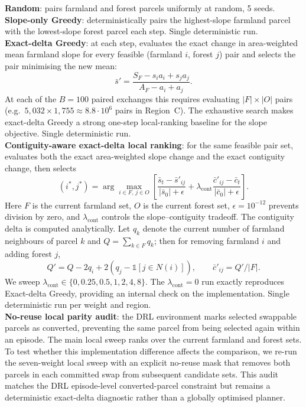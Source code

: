 \documentclass[]{interact}
\theoremstyle{plain}
\begin{document}
\textbf{Random}: pairs farmland and forest parcels uniformly at random, 5 seeds.\\
\textbf{Slope-only Greedy}: deterministically pairs the highest-slope farmland parcel with the lowest-slope forest parcel each step. Single deterministic run.\\
\textbf{Exact-delta Greedy}: at each step, evaluates the exact change in area-weighted mean farmland slope for every feasible (farmland $i$, forest $j$) pair and selects the pair minimising the new mean:
$$\bar{s}' = \frac{S_F - s_i a_i + s_j a_j}{A_F - a_i + a_j}.$$
At each of the $B = 100$ paired exchanges this requires evaluating $|F| \times |O|$ pairs (e.g.\ $5{,}032 \times 1{,}755 \approx 8.8 \cdot 10^6$ pairs in Region~C). The exhaustive search makes exact-delta Greedy a strong one-step local-ranking baseline for the slope objective. Single deterministic run.\\
\textbf{Contiguity-aware exact-delta local ranking}: for the same feasible pair set, evaluates both the exact area-weighted slope change and the exact contiguity change, then selects
\begin{equation}
(i^\ast,j^\ast) = \arg\max_{i \in F,\, j \in O}
\left[
\frac{\bar{s}_t-\bar{s}'_{ij}}{|\bar{s}_0|+\epsilon}
+ \lambda_{\mathrm{cont}}
\frac{\bar{c}'_{ij}-\bar{c}_t}{|\bar{c}_0|+\epsilon}
\right].
\label{eq:local-scalar}
\end{equation}
Here $F$ is the current farmland set, $O$ is the current forest set, $\epsilon=10^{-12}$ prevents division by zero, and $\lambda_{\mathrm{cont}}$ controls the slope--contiguity tradeoff. The contiguity delta is computed analytically. Let $q_k$ denote the current number of farmland neighbours of parcel $k$ and $Q=\sum_{k\in F}q_k$; then for removing farmland $i$ and adding forest $j$,
$$Q' = Q - 2q_i + 2(q_j-\mathbb{1}[j\in N(i)]), \qquad \bar{c}'_{ij}=Q'/|F|.$$
We sweep $\lambda_{\mathrm{cont}}\in\{0,0.25,0.5,1,2,4,8\}$. The $\lambda_{\mathrm{cont}}=0$ run exactly reproduces Exact-delta Greedy, providing an internal check on the implementation. Single deterministic run per weight and region.\\
\textbf{No-reuse local parity audit}: the DRL environment marks selected swappable parcels as converted, preventing the same parcel from being selected again within an episode. The main local sweep ranks over the current farmland and forest sets. To test whether this implementation difference affects the comparison, we re-run the seven-weight local sweep with an explicit no-reuse mask that removes both parcels in each committed swap from subsequent candidate sets. This audit matches the DRL episode-level converted-parcel constraint but remains a deterministic exact-delta diagnostic rather than a globally optimised planner.\\
\end{document}
